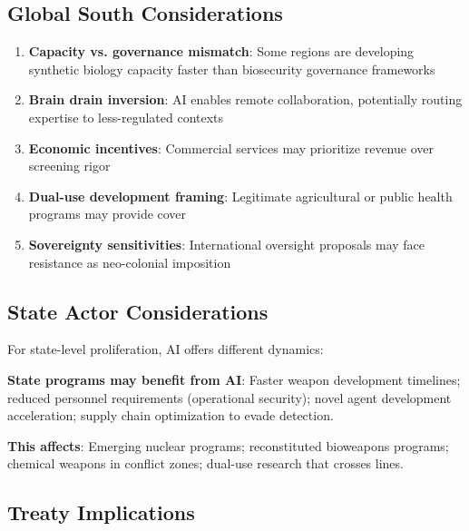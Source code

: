 \documentclass[11pt,letterpaper]{article}
\begin{document}
\subsection{Global South Considerations}

\begin{enumerate}
  \item \textbf{Capacity vs. governance mismatch}: Some regions are developing synthetic biology capacity faster than biosecurity governance frameworks
  \item \textbf{Brain drain inversion}: AI enables remote collaboration, potentially routing expertise to less-regulated contexts
  \item \textbf{Economic incentives}: Commercial services may prioritize revenue over screening rigor
  \item \textbf{Dual-use development framing}: Legitimate agricultural or public health programs may provide cover
  \item \textbf{Sovereignty sensitivities}: International oversight proposals may face resistance as neo-colonial imposition
\end{enumerate}

\subsection{State Actor Considerations}

For state-level proliferation, AI offers different dynamics:

\textbf{State programs may benefit from AI}: Faster weapon development timelines; reduced personnel requirements (operational security); novel agent development acceleration; supply chain optimization to evade detection.

\textbf{This affects}: Emerging nuclear programs; reconstituted bioweapons programs; chemical weapons in conflict zones; dual-use research that crosses lines.

\subsection{Treaty Implications}
\end{document}
